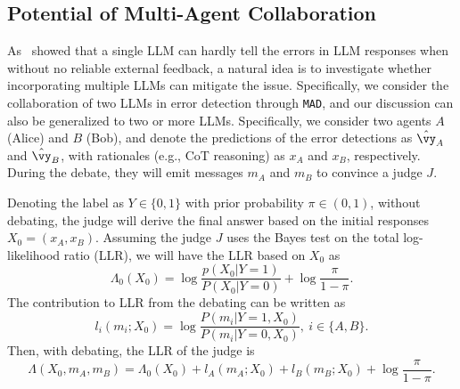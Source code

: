 \documentclass{article} %
\newcommand{\yq}[1]{\textcolor{darkred}{#1}}
\newcommand{\ours}[0]{\texttt{ColMAD}\xspace}
\newcommand{\mad}[0]{\texttt{MAD}\xspace}
\newcommand{\my}[1]{{\color{deepgreen}{(Mao: #1)}}}
\begin{document}




\subsection{Potential of Multi-Agent Collaboration}
\label{sec:mad_potential}
As~\citet{realmistake} showed that a single LLM can hardly tell the errors in LLM responses when without no reliable external feedback, a natural idea is to investigate whether incorporating multiple LLMs can mitigate the issue.
Specifically, we consider the collaboration of two LLMs in error detection through \mad, and our discussion can also be generalized to two or more LLMs.
% 
Specifically, we consider two agents $A$ (Alice) and $B$ (Bob), and denote the predictions of the error detections as $\hat{\vy}_A$ and $\hat{\vy}_B$, with rationales (e.g., CoT reasoning) as $x_A$ and $x_B$, respectively. During the debate, they will emit messages $m_A$ and $m_B$ to convince a judge $J$. 
\begin{assumption}
Denoting the label as $Y\in\{0,1\}$ with prior probability $\pi\in(0,1)$, without debating, the judge will derive the final answer based on the initial responses $X_0=(x_A,x_B)$. Assuming the judge $J$ uses the Bayes test on the total log-likelihood ratio (LLR), we will have the LLR based on $X_0$ as
\begin{equation}\label{eq:llr_x0}
    \Lambda_0(X_0)=\log\frac{p(X_0|Y=1)}{P(X_0|Y=0)}+\log\frac{\pi}{1-\pi}.
\end{equation}
The contribution to LLR from the debating can be written as
\begin{equation}\label{eq:llr_contrib}
    l_i(m_i;X_0)=\log\frac{P(m_i|Y=1,X_0)}{P(m_i|Y=0,X_0)},\ i\in\{A,B\}.
\end{equation}
Then, with debating, the LLR of the judge is
\begin{equation}\label{eq:llr_debating}
\Lambda(X_0,m_A,m_B)=\Lambda_0(X_0)+l_A(m_A;X_0)+l_B(m_B;X_0)+\log\frac{\pi}{1-\pi}.
\end{equation}
\end{assumption}
\end{document}
